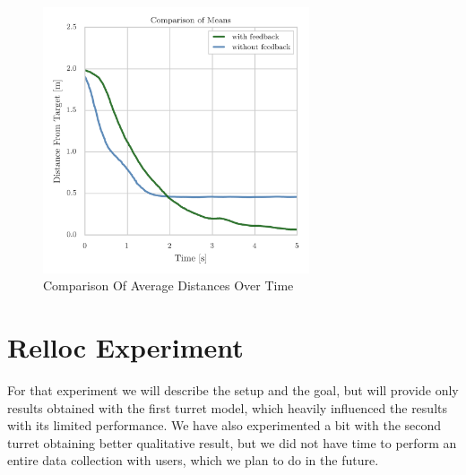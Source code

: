 \begin{figure}
	\centering
	\includegraphics[width=0.7\textwidth]{img/avgDistance.png}%
	\caption{Comparison Of Average Distances Over Time}
	\label{fig:avgDistance}
\end{figure}

\section{Relloc Experiment}
For that experiment we will describe the setup and the goal, but will provide only results obtained with the first turret model, which heavily influenced the results with its limited performance. We have also experimented a bit with the second turret obtaining better qualitative result, but we did not have time to perform an entire data collection with users, which we plan to do in the future.

